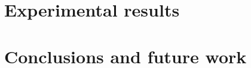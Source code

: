 \documentclass[a4paper,10pt,conference]{ieeeconf}
\begin{document}
\section{Experimental results}
\label{sec::experiments}


\section{Conclusions and future work}
\label{sec::conclu}


%

{\small


}
\end{document}

